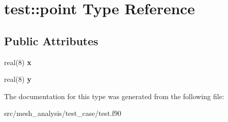\hypertarget{structtest_1_1point}{\section{test\-:\-:point Type Reference}
\label{structtest_1_1point}
}
\subsection*{Public Attributes}
\begin{DoxyCompactItemize}
\item 
\hypertarget{structtest_1_1point_ae212d7a1eed7165d99800d948e033a3b}{real(8) {\bfseries x}}\label{structtest_1_1point_ae212d7a1eed7165d99800d948e033a3b}

\item 
\hypertarget{structtest_1_1point_a4b561b0e1dad471d3c556710045fbde7}{real(8) {\bfseries y}}\label{structtest_1_1point_a4b561b0e1dad471d3c556710045fbde7}

\end{DoxyCompactItemize}


The documentation for this type was generated from the following file\-:\begin{DoxyCompactItemize}
\item 
src/mesh\-\_\-analysis/test\-\_\-case/test.\-f90\end{DoxyCompactItemize}
